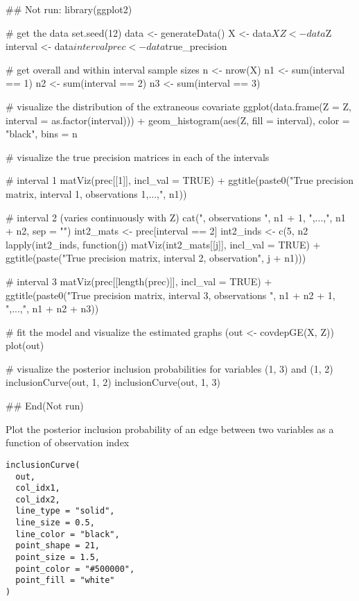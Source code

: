 \documentclass[a4paper]{book}
\begin{document}
\begin{Examples}
\begin{ExampleCode}
## Not run: 
library(ggplot2)

# get the data
set.seed(12)
data <- generateData()
X <- data$X
Z <- data$Z
interval <- data$interval
prec <- data$true_precision

# get overall and within interval sample sizes
n <- nrow(X)
n1 <- sum(interval == 1)
n2 <- sum(interval == 2)
n3 <- sum(interval == 3)

# visualize the distribution of the extraneous covariate
ggplot(data.frame(Z = Z, interval = as.factor(interval))) +
  geom_histogram(aes(Z, fill = interval), color = "black", bins = n %

# visualize the true precision matrices in each of the intervals

# interval 1
matViz(prec[[1]], incl_val = TRUE) +
  ggtitle(paste0("True precision matrix, interval 1, observations 1,...,", n1))

# interval 2 (varies continuously with Z)
cat(", observations ", n1 + 1, ",...,", n1 + n2, sep = "")
int2_mats <- prec[interval == 2]
int2_inds <- c(5, n2 %
lapply(int2_inds, function(j) matViz(int2_mats[[j]], incl_val = TRUE) +
         ggtitle(paste("True precision matrix, interval 2, observation", j + n1)))

# interval 3
matViz(prec[[length(prec)]], incl_val = TRUE) +
  ggtitle(paste0("True precision matrix, interval 3, observations ",
                 n1 + n2 + 1, ",...,", n1 + n2 + n3))

# fit the model and visualize the estimated graphs
(out <- covdepGE(X, Z))
plot(out)

# visualize the posterior inclusion probabilities for variables (1, 3) and (1, 2)
inclusionCurve(out, 1, 2)
inclusionCurve(out, 1, 3)

## End(Not run)
\end{ExampleCode}
\end{Examples}
%
\begin{Description}\relax
Plot the posterior inclusion probability of an edge between two
variables as a function of observation index
\end{Description}
%
\begin{Usage}
\begin{verbatim}
inclusionCurve(
  out,
  col_idx1,
  col_idx2,
  line_type = "solid",
  line_size = 0.5,
  line_color = "black",
  point_shape = 21,
  point_size = 1.5,
  point_color = "#500000",
  point_fill = "white"
)
\end{verbatim}
\end{Usage}
\end{document}
